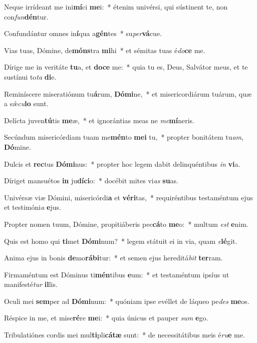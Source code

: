 \item Neque irrídeant me ini\textbf{mí}ci \textbf{me}i:~* étenim univérsi, qui sústinent te, non con\textit{fun}\textbf{dén}tur.
\item Confundántur omnes in\textbf{í}qua a\textbf{gén}tes~* su\textit{per}\textbf{vá}cue.
\item Vias tuas, Dómine, de\textbf{móns}tra \textbf{mi}hi~* et sémitas tuas é\textit{do}\textbf{ce} me.
\item Dírige me in veritáte \textbf{tu}a, et \textbf{do}\textbf{ce} me:~* quia tu es, Deus, Salvátor meus, et te sustínui to\textit{ta} \textbf{di}e.
\item Reminíscere miseratiónum tu\textbf{á}rum, \textbf{Dó}\textbf{mi}ne,~* et misericordiárum tuárum, quæ a sǽ\textit{cu}\textbf{lo} sunt.
\item Delícta juven\textbf{tú}tis \textbf{me}æ,~* et ignorántias meas ne \textit{me}\textbf{mí}neris.
\item Secúndum misericórdiam tuam me\textbf{mén}to \textbf{me}\textbf{i} tu,~* propter bonitátem tu\textit{am}, \textbf{Dó}mine.
\item Dulcis et \textbf{rec}tus \textbf{Dó}\textbf{mi}nus:~* propter hoc legem dabit delinquéntibus \textit{in} \textbf{vi}a.
\item Díriget mansuétos \textbf{in} ju\textbf{dí}\textbf{ci}o:~* docébit mites vi\textit{as} \textbf{su}as.
\item Univérsæ viæ Dómini, misericórdi\textbf{a} et \textbf{vé}\textbf{ri}tas,~* requiréntibus testaméntum ejus et testimóni\textit{a} \textbf{e}jus.
\item Propter nomen tuum, Dómine, propitiáberis pec\textbf{cá}to \textbf{me}o:~* multum \textit{est} \textbf{e}nim.
\item Quis est homo qui \textbf{ti}met \textbf{Dó}\textbf{mi}num?~* legem státuit ei in via, quam \textit{e}\textbf{lé}git.
\item Anima ejus in bonis \textbf{de}mo\textbf{rá}\textbf{bi}tur:~* et semen ejus hereditá\textit{bit} \textbf{ter}ram.
\item Firmaméntum est Dóminus ti\textbf{mén}tibus \textbf{e}um:~* et testaméntum ipsíus ut manifesté\textit{tur} \textbf{il}lis.
\item Oculi mei \textbf{sem}per ad \textbf{Dó}\textbf{mi}num:~* quóniam ipse evéllet de láqueo pe\textit{des} \textbf{me}os.
\item Réspice in me, et mise\textbf{ré}re \textbf{me}i:~* quia únicus et pauper \textit{sum} \textbf{e}go.
\item Tribulatiónes cordis mei mul\textbf{ti}pli\textbf{cá}\textbf{tæ} sunt:~* de necessitátibus meis é\textit{ru}\textbf{e} me.
